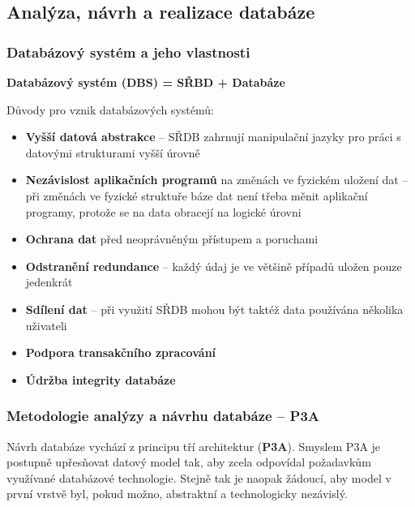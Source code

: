 \documentclass[12pt,a4paper]{article}
\begin{document}
\subsection{Analýza, návrh a realizace databáze}

\subsubsection{Databázový systém a jeho vlastnosti}

\textbf{Databázový systém (DBS) = SŘBD + Databáze}

Důvody pro vznik databázových systémů:
\begin{itemize}
  \item \textbf{Vyšší datová abstrakce} -- SŘDB zahrnují manipulační jazyky pro práci s datovými
    strukturami vyšší úrovně
  \item \textbf{Nezávislost aplikačních programů} na změnách ve fyzickém uložení dat -- při změnách
    ve fyzické struktuře báze dat není třeba měnit aplikační programy, protože se na data obracejí
    na logické úrovni
  \item \textbf{Ochrana dat} před neoprávněným přístupem a poruchami
  \item \textbf{Odstranění redundance} -- každý údaj je ve většině případů uložen pouze jedenkrát
  \item \textbf{Sdílení dat} -- při využití SŘDB mohou být taktéž data používána několika uživateli
  \item \textbf{Podpora transakčního zpracování}
  \item \textbf{Údržba integrity databáze}
\end{itemize}

\subsubsection{Metodologie analýzy a návrhu databáze -- P3A}

Návrh databáze vychází z principu tří architektur (\textbf{P3A}). Smyslem P3A je postupně upřesňovat
datový model tak, aby zcela odpovídal požadavkům využívané databázové technologie. Stejně tak je
naopak žádoucí, aby model v první vrstvě byl, pokud možno, abstraktní a technologicky nezávislý.
\end{document}
